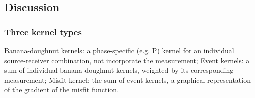 \subsection{Discussion}
\subsubsection{Three kernel types}
Banana-doughnut kernels: a phase-specific (e.g. P) kernel
for an individual source-receiver combination, not incorporate the measurement;
Event kernels: a sum of individual banana-doughnut kernels,
weighted by its corresponding measurement;
Misfit kernel: the sum of event kernels,
a graphical representation of the gradient of the misfit function.


